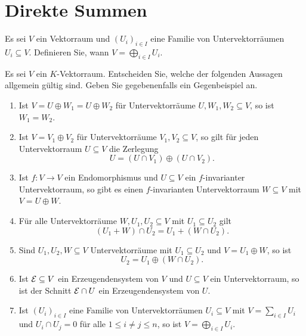 \section{Direkte Summen}







\begin{question}[subtitle = Definition der direkten Summe]{1}
  Es sei $V$ ein Vektorraum und $(U_i)_{i \in I}$ eine Familie von Untervektorräumen $U_i \subseteq V$.
  Definieren Sie, wann $V = \bigoplus_{i \in I} U_i$.
\end{question}







\begin{question}[subtitle = Multiple Choice für Direkte Summen]{2}
  Es sei $V$ ein $K$-Vektorraum.
  Entscheiden Sie, welche der folgenden Aussagen allgemein gültig sind.
  Geben Sie gegebenenfalls ein Gegenbeispiel an.
  \begin{enumerate}[leftmargin=*]
    \item
      Ist $V = U \oplus W_1 = U \oplus W_2$ für Untervektorräume $U, W_1, W_2 \subseteq V$, so ist $W_1 = W_2$.
    \item
      Ist $V = V_1 \oplus V_2$ für Untervektorräume $V_1, V_2 \subseteq V$, so gilt für jeden Untervektorraum $U \subseteq V$ die Zerlegung
      \[
        U = (U \cap V_1) \oplus (U \cap V_2).
      \]
    \item
      Ist $f \colon V \to V$ ein Endomorphismus und $U \subseteq V$ ein $f$-invarianter Untervektorraum, so gibt es einen $f$-invarianten Untervektorraum $W \subseteq V$ mit $V = U \oplus W$.
    \item
      Für alle Untervektorräume $W, U_1, U_2 \subseteq V$ mit $U_1 \subseteq U_2$ gilt
      \[
        (U_1 + W) \cap U_2 =  U_1 + (W \cap U_2).
      \]
    \item
      Sind $U_1, U_2, W \subseteq V$ Untervektorräume mit $U_1 \subseteq U_2$ und $V = U_1 \oplus W$, so ist
      \[
        U_2 = U_1 \oplus (W \cap U_2).
      \]
    \item
      Ist $\mathcal{E} \subseteq V$ ein Erzeugendensystem von $V$ und $U \subseteq V$ ein Untervektorraum, so ist der Schnitt $\mathcal{E} \cap U$ ein Erzeugendensystem von $U$.
    \item
      Ist $(U_i)_{i \in I}$ eine Familie von Untervektorräumen $U_i \subseteq V$ mit $V = \sum_{i \in I} U_i$ und $U_i \cap U_j = 0$ für alle $1 \leq i \neq j \leq n$, so ist $V = \bigoplus_{i \in I} U_i$.
  \end{enumerate}
\end{question}






